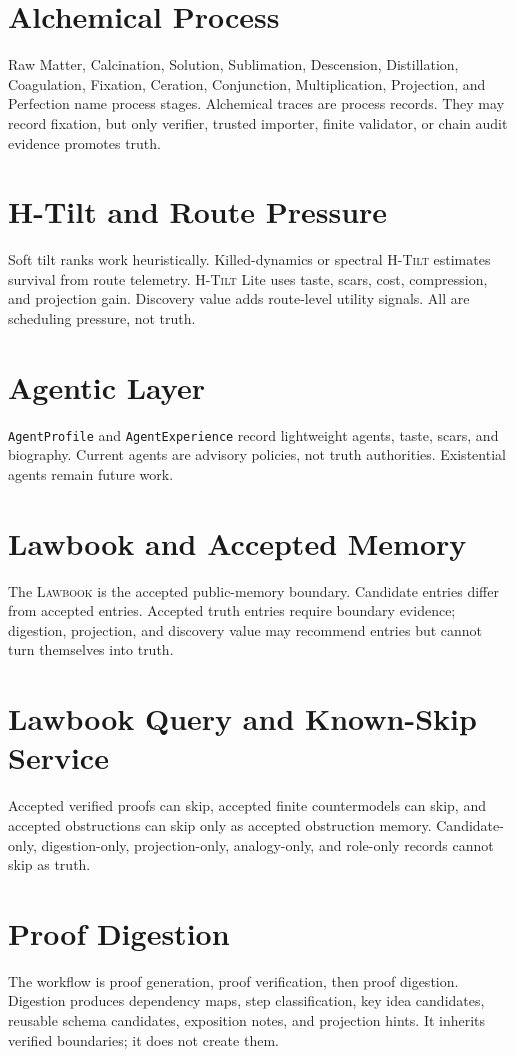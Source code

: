 \documentclass[11pt,a4paper]{article}
\newcommand{\Lawbook}{\textsc{Lawbook}}
\newcommand{\HTilt}{\textsc{H-Tilt}}
\begin{document}
\section{Alchemical Process}
Raw Matter, Calcination, Solution, Sublimation, Descension, Distillation, Coagulation, Fixation, Ceration, Conjunction, Multiplication, Projection, and Perfection name process stages. Alchemical traces are process records. They may record fixation, but only verifier, trusted importer, finite validator, or chain audit evidence promotes truth.

\section{H-Tilt and Route Pressure}
Soft tilt ranks work heuristically. Killed-dynamics or spectral \HTilt{} estimates survival from route telemetry. \HTilt{} Lite uses taste, scars, cost, compression, and projection gain. Discovery value adds route-level utility signals. All are scheduling pressure, not truth.

\section{Agentic Layer}
\texttt{AgentProfile} and \texttt{AgentExperience} record lightweight agents, taste, scars, and biography. Current agents are advisory policies, not truth authorities. Existential agents remain future work.

\section{Lawbook and Accepted Memory}
The \Lawbook{} is the accepted public-memory boundary. Candidate entries differ from accepted entries. Accepted truth entries require boundary evidence; digestion, projection, and discovery value may recommend entries but cannot turn themselves into truth.

\section{Lawbook Query and Known-Skip Service}
Accepted verified proofs can skip, accepted finite countermodels can skip, and accepted obstructions can skip only as accepted obstruction memory. Candidate-only, digestion-only, projection-only, analogy-only, and role-only records cannot skip as truth.

\section{Proof Digestion}
The workflow is proof generation, proof verification, then proof digestion. Digestion produces dependency maps, step classification, key idea candidates, reusable schema candidates, exposition notes, and projection hints. It inherits verified boundaries; it does not create them.
\end{document}
